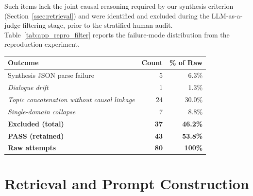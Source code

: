 \documentclass[a4paper,fleql]{cas-sc}
\begin{document}
Such items lack the joint causal reasoning required by our synthesis
criterion (Section~\ref{ssec:retrieval}) and were identified and excluded
during the LLM-as-a-judge filtering stage, prior to the stratified human
audit.
Table~\ref{tab:app_repro_filter} reports the failure-mode distribution
from the reproduction experiment.

\vspace{4pt}
\begin{center}
\begingroup
{}
\label{tab:app_repro_filter}
\small
\renewcommand{\arraystretch}{1.3}
\begin{tabular}{lrr}
\toprule
\textbf{Outcome} & \textbf{Count} & \textbf{\% of Raw} \\
\midrule
Synthesis JSON parse failure        &  5 &  6.3\% \\
\textit{Dialogue drift}             &  1 &  1.3\% \\
\textit{Topic concatenation without causal linkage} & 24 & 30.0\% \\
\textit{Single-domain collapse}     &  7 &  8.8\% \\
\midrule
\textbf{Excluded (total)}           & \textbf{37} & \textbf{46.2\%} \\
\midrule
\textbf{PASS (retained)}            & \textbf{43} & \textbf{53.8\%} \\
\midrule
\textbf{Raw attempts}               & \textbf{80} & \textbf{100\%} \\
\bottomrule
\end{tabular}
\endgroup
\end{center}
\vspace{4pt}

\section{Retrieval and Prompt Construction}
\label{app:prompts}
\end{document}
